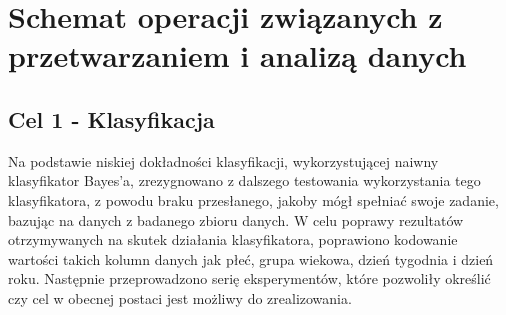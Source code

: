 \documentclass{classrep}
\begin{document}
    \section{Schemat operacji związanych z przetwarzaniem i analizą danych}
    \label{operation_schema} {

        \subsection{Cel 1 - Klasyfikacja} {
            Na podstawie niskiej dokładności klasyfikacji, wykorzystującej naiwny klasyfikator Bayes'a, zrezygnowano z dalszego testowania wykorzystania tego klasyfikatora, z powodu braku przesłanego, jakoby mógł spełniać swoje zadanie, bazując na danych z badanego zbioru danych.
            W celu poprawy rezultatów otrzymywanych na skutek działania klasyfikatora, poprawiono kodowanie wartości takich kolumn danych jak płeć, grupa wiekowa, dzień tygodnia i dzień roku. Następnie przeprowadzono serię eksperymentów, które pozwoliły określić czy cel w obecnej postaci jest możliwy do zrealizowania.
        }

    }
\end{document}
